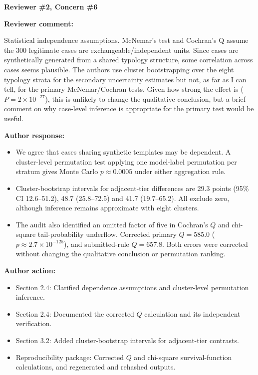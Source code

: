 \documentclass[11pt]{article}
\newcommand{\rvcomment}[1]{{\color{ReviewerGreen}#1}}
\newcommand{\concern}[1]{\textbf{\color{ReviewerGreen}#1}}
\begin{document}
\vspace{12pt}
\concern{Reviewer \#2, Concern \#6}

\concern{Reviewer comment:}

\rvcomment{Statistical independence assumptions. McNemar's test and Cochran's Q assume the 300 legitimate cases are exchangeable/independent units. Since cases are synthetically generated from a shared typology structure, some correlation across cases seems plausible. The authors use cluster bootstrapping over the eight typology strata for the secondary uncertainty estimates but not, as far as I can tell, for the primary McNemar/Cochran tests. Given how strong the effect is ($P = 2\times10^{-27}$), this is unlikely to change the qualitative conclusion, but a brief comment on why case-level inference is appropriate for the primary test would be useful.}

\textbf{Author response:}

\begin{itemize}

\item We agree that cases sharing synthetic templates may be dependent. A cluster-level permutation test applying one model-label permutation per stratum gives Monte Carlo $p \approx 0.0005$ under either aggregation rule.

\item Cluster-bootstrap intervals for adjacent-tier differences are 29.3 points (95\% CI 12.6--51.2), 48.7 (25.8--72.5) and 41.7 (19.7--65.2). All exclude zero, although inference remains approximate with eight clusters.

\item The audit also identified an omitted factor of five in Cochran's $Q$ and chi-square tail-probability underflow. Corrected primary $Q = 585.0$ ($p \approx 2.7\times10^{-125}$), and submitted-rule $Q = 657.8$. Both errors were corrected without changing the qualitative conclusion or permutation ranking.

\end{itemize}

\textbf{Author action:}

\begin{itemize}

\item Section 2.4: Clarified dependence assumptions and cluster-level permutation inference.

\item Section 2.4: Documented the corrected $Q$ calculation and its independent verification.

\item Section 3.2: Added cluster-bootstrap intervals for adjacent-tier contrasts.

\item Reproducibility package: Corrected $Q$ and chi-square survival-function calculations, and regenerated and rehashed outputs.

\end{itemize}
\end{document}

